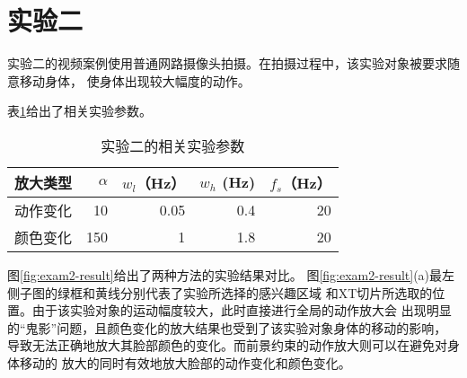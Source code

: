 \section{实验二}
\label{sec:man-moving}

实验二的视频案例使用普通网路摄像头拍摄。在拍摄过程中，该实验对象被要求随意移动身体，
使身体出现较大幅度的动作。

表\ref{tab:exam2-data}给出了相关实验参数。

\begin{table}[htbp]
  \centering
  \caption{实验二的相关实验参数}
  \label{tab:exam2-data}
  \begin{tabular}[c]{crrrr}
    \toprule[1.5pt]
    放大类型 & $\alpha$ & $w_l$（Hz） & $w_h$ (Hz) & $f_s$（Hz）\\
    \midrule
    动作变化 & 10 & 0.05 & 0.4 & 20 \\
    颜色变化 & 150 & 1 & 1.8 & 20 \\
    \bottomrule[1.5pt]
  \end{tabular}
\end{table}

图\ref{fig:exam2-result}给出了两种方法的实验结果对比。
图\ref{fig:exam2-result}(a)最左侧子图的绿框和黄线分别代表了实验所选择的感兴趣区域
和XT切片所选取的位置。由于该实验对象的运动幅度较大，此时直接进行全局的动作放大会
出现明显的“鬼影”问题，且颜色变化的放大结果也受到了该实验对象身体的移动的影响，
导致无法正确地放大其脸部颜色的变化。而前景约束的动作放大则可以在避免对身体移动的
放大的同时有效地放大脸部的动作变化和颜色变化。


